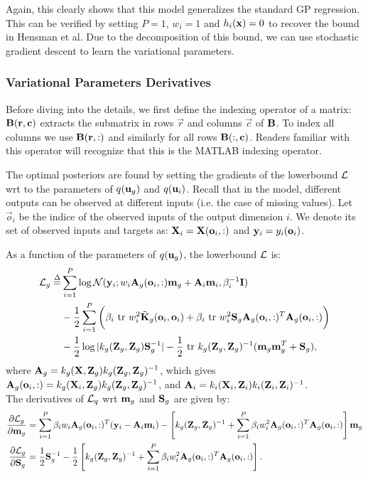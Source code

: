 \documentclass{article} %
\begin{document}
\noindent Again, this clearly shows that this model generalizes the standard GP regression. This can be verified by setting $P = 1$, $w_i = 1$ and $h_i(\x) = 0$ to recover the bound in Hensman et al.
Due to the decomposition of this bound, we can use stochastic gradient descent to learn the variational parameters.

\subsubsection{Variational Parameters Derivatives}
\newcommand{\oi}{\vec{o}_i}
Before diving into the details, we first define the indexing operator of a matrix: $\B(\vec{r},\vec{c})$ extracts the submatrix in rows $\vec{r}$ and columns $\vec{c}$ of $\B$.
To index all columns we use $\B(\vec{r},:)$ and similarly for all rows $\B(:,\vec{c})$.
Readers familiar with this operator will recognize that this is the MATLAB indexing operator.

The optimal posteriors are found by setting the gradients of the lowerbound $\calL$ wrt to the parameters of $q(\ug)$ and $q(\u_i)$.
Recall that in the model, different outputs can be observed at different inputs (i.e. the case of missing values).
Let $\oi$ be the indice of the observed inputs of the output dimension $i$.
We denote its set of observed inputs and targets as: $\X_i = \X(\oi,:)$ and $\y_i = y_{i}(\oi)$.

\noindent As a function of the parameters of $q(\ug)$, the lowerbound $\calL$ is:
\begin{align}
\nonumber
\calL_g \define&
 \sum_{i=1}^P \log \Normal(\y_i; w_i \A_g(\oi,:) \m_g + \A_i \m_i, \beta_i^{-1} \I)  \\
 &- \frac{1}{2} \sum_{i=1}^P \bigg(\beta_i \trace w_i^2 \tilde{\K}_g(\oi,\oi) 
 + \beta_i \trace w_i^2 \S_g \A_g(\oi,:)^T \A_g(\oi,:) \bigg)
 \\
 &- \frac{1}{2} \log |k_g(\Zg,\Zg) \S_g^{-1}| -\frac{1}{2} \trace k_g(\Zg,\Zg)^{-1} (\m_g \m_g^T + \S_g) ,
\end{align}
where $\A_g = k_g(\X,\Z_g)k_g(\Z_g,\Z_g)^{-1}$, which gives $\A_g(\oi,:) = k_g(\X_i,\Zg) k_g(\Z_g,\Z_g)^{-1}$, and  
$\A_i = k_i(\X_i,\Z_i)k_i(\Z_i,\Z_i)^{-1}$. \\

\noindent The derivatives of $\calL_q$ wrt $\m_g$ and $\S_g$ are given by:
\begin{align}
\deriv{\calL_g}{\m_g}
& = \sum_{i=1}^P \beta_i w_i \A_g(\oi,:)^T (\y_i - \A_i \m_i) - \left[k_g(\Zg,\Zg)^{-1} + \sum_{i=1}^P \beta_i w_i^2 \A_g(\oi,:)^T \A_g(\oi,:) \right] \m_g \\
\deriv{\calL_g}{\S_g} 
&= \frac{1}{2} \S_g^{-1} - \frac{1}{2} \left[ k_g(\Zg,\Zg)^{-1} + \sum_{i=1}^P \beta_i w_i^2 \A_g(\oi,:)^T \A_g(\oi,:) \right].
\end{align}
\end{document}
